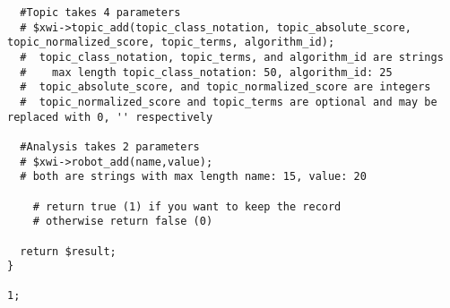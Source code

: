 \begin{verbatim}
  #Topic takes 4 parameters
  # $xwi->topic_add(topic_class_notation, topic_absolute_score, topic_normalized_score, topic_terms, algorithm_id);
  #  topic_class_notation, topic_terms, and algorithm_id are strings
  #    max length topic_class_notation: 50, algorithm_id: 25
  #  topic_absolute_score, and topic_normalized_score are integers
  #  topic_normalized_score and topic_terms are optional and may be replaced with 0, '' respectively

  #Analysis takes 2 parameters
  # $xwi->robot_add(name,value);
  # both are strings with max length name: 15, value: 20

    # return true (1) if you want to keep the record
    # otherwise return false (0)

  return $result;
}

1;
\end{verbatim}
